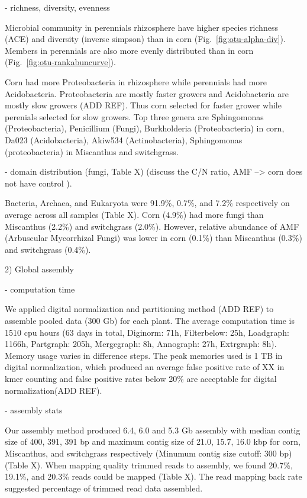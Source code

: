 \documentclass[12pt]{article}
\begin{document}
- richness, diversity, evenness

Microbial community in perennials rhizosphere have higher species richness (ACE) and diversity (inverse simpson) than in corn (Fig.~\ref{fig:otu-alpha-div}). Members in perennials are also more evenly distributed than in corn (Fig.~\ref{fig:otu-rankabuncurve}).

Corn had more Proteobacteria in rhizosphere while perennials had more Acidobacteria. Proteobacteria are mostly faster growers and Acidobacteria are mostly slow growers (ADD REF). Thus corn selected for faster grower while perenials selected for slow growers. Top three genera are Sphingomonas (Proteobacteria), Penicillium (Fungi), Burkholderia (Proteobacteria) in corn, Da023 (Acidobacteria), Akiw534 (Actinobacteria), Sphingomonas (proteobacteria) in Miscanthus and switchgrass.

- domain distribution (fungi, Table X) (discuss the C/N ratio, AMF --> corn does not have control ).

Bacteria, Archaea, and Eukaryota were 91.9\%, 0.7\%, and 7.2\% respectively on average across all samples (Table X). Corn (4.9\%) had more fungi than Miscanthus (2.2\%) and switchgrass (2.0\%). However, relative abundance of AMF (Arbuscular Mycorrhizal Fungi) was lower in corn (0.1\%) than Miscanthus (0.3\%) and switchgrass (0.4\%).
  
2) Global assembly

- computation time

We applied digital normalization and partitioning method (ADD REF) to assemble pooled data (300 Gb) for each plant. The average computation time is 1510 cpu hours (63 days in total, Diginorm: 71h, Filterbelow: 25h, Loadgraph: 1166h, Partgraph: 205h, Mergegraph: 8h, Annograph: 27h, Extrgraph: 8h). Memory usage varies in difference steps. The peak memories used is 1 TB in digital normalization, which produced an average false positive rate of XX in kmer counting and false positive rates below 20\% are acceptable for digital normalization(ADD REF). 

- assembly stats

Our assembly method produced  6.4, 6.0 and 5.3 Gb assembly with median contig size of 400, 391, 391 bp and maximum contig size of 21.0, 15.7, 16.0 kbp for corn, Miscanthus, and switchgrass respectively (Minumum contig size cutoff: 300 bp)(Table X). When mapping quality trimmed reads to assembly, we found 20.7\%, 19.1\%, and 20.3\% reads could be mapped (Table X). The read mapping back rate suggested percentage of trimmed read data assembled.
\end{document}
